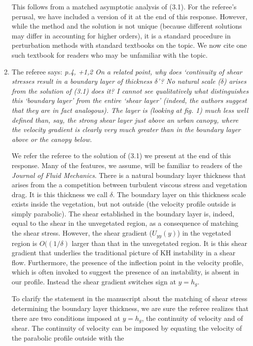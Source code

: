 \documentclass[letterpaper,10pt]{article}
\begin{document}
\begin{enumerate}
This follows from a matched asymptotic analysis of (3.1). For the referee's perusal, we have included a version of it at the end of this response. However, while the method and the solution is not unique (because different solutions may differ in accounting for higher orders), it is a standard procedure in perturbation methods with standard textbooks on the topic. We now cite one such textbook \citep{Hinch1991} for readers who may be unfamiliar with the topic.


\item The referee says:
\textit{
p.4, +1,2 On a related point, why does ‘continuity of shear stresses result in a boundary layer of thickness $\delta$’? No natural scale ($\delta$) arises from the solution of (3.1) does it? I cannot see qualitatively what distinguishes this `boundary layer' from the entire `shear layer' (indeed, the authors suggest that they are in fact analogous). The layer is (looking at fig. 1) much less well defined than, say, the strong shear layer just above an urban canopy, where the velocity gradient is clearly very much greater than in the boundary layer above or the canopy below.
}

We refer the referee to the solution of (3.1) we present at the end of this response.
Many of the features, we assume, will be familiar to readers of the \textit{Journal of Fluid Mechanics}.
There is a natural boundary layer thickness that arises from the a competition between turbulent viscous stress and vegetation drag.
It is this thickness we call $\delta$.
The boundary layer on this thickness scale exists inside the vegetation, but not outside (the velocity profile outside is simply parabolic). 
The shear established in the boundary layer is, indeed, equal to the shear in the unvegetated region, as a consequence of matching the shear stress.
However, the shear gradient ($U_{yy}(y)$) in the vegetated region is $O((1/\delta)$ larger than that in the unvegetated region.
It is this shear gradient that underlies the traditional picture of KH instability in a shear flow.
Furthermore, the presence of the inflection point in the velocity profile, which is often invoked to suggest the presence of an instability, is absent in our profile.
Instead the shear gradient switches sign at $y=h_g$.

To clarify the statement in the manuscript about the matching of shear stress determining the boundary layer thickness, we are sure the referee realizes that there are two conditions imposed at $y=h_g$, the continuity of velocity and of shear.
The continuity of velocity can be imposed by equating the velocity of the parabolic profile outside with the 



\end{enumerate}
\end{document}
